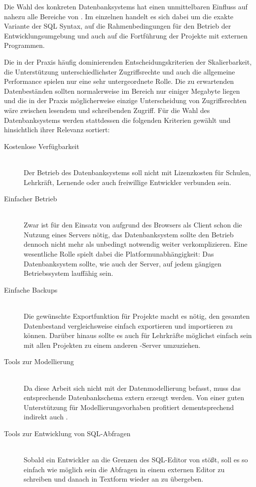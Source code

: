 Die Wahl des konkreten Datenbanksystems hat einen unmittelbaren Einfluss auf nahezu alle Bereiche von \idename. Im einzelnen handelt es sich dabei um die exakte Variante der SQL Syntax, auf die Rahmenbedingungen für den Betrieb der Entwicklungsumgebung und auch auf die Fortführung der Projekte mit externen Programmen.

Die in der Praxis häufig dominierenden Entscheidungskriterien der Skalierbarkeit, die Unterstützung unterschiedlichster Zugriffsrechte und auch die allgemeine Performance spielen nur eine sehr untergeordnete Rolle. Die zu erwartenden Datenbeständen sollten normalerweise im Bereich nur einiger Megabyte liegen und die in der Praxis möglicherweise einzige Unterscheidung von Zugriffsrechten wäre zwischen lesendem und schreibenden Zugriff. Für die Wahl des Datenbanksystems werden stattdessen die folgenden Kriterien gewählt und hinsichtlich ihrer Relevanz sortiert:

\begin{description}  
\item[Kostenlose Verfügbarkeit] \hfill \\
  Der Betrieb des Datenbanksystems soll nicht mit Lizenzkosten für Schulen, Lehrkräft, Lernende oder auch freiwillige Entwickler verbunden sein.
\item[Einfacher Betrieb] \hfill \\
  Zwar ist für den Einsatz von \idename aufgrund des Browsers als Client schon die Nutzung eines Servers nötig, das Datenbanksystem sollte den Betrieb dennoch nicht mehr als unbedingt notwendig weiter verkomplizieren. Eine wesentliche Rolle spielt dabei die Platformunabhängigkeit: Das Datenbanksystem sollte, wie auch der \idename Server, auf jedem gängigen Betriebssystem lauffähig sein.
\item[Einfache Backups] \hfill \\
  Die gewünschte Exportfunktion für Projekte macht es nötig, den gesamten Datenbestand vergleichsweise einfach exportieren und importieren zu können. Darüber hinaus sollte es auch für Lehrkräfte möglichst einfach sein mit allen Projekten zu einem anderen \idename-Server umzuziehen.
\item[Tools zur Modellierung] \hfill \\
  Da diese Arbeit sich nicht mit der Datenmodellierung befasst, muss das entsprechende Datenbankschema extern erzeugt werden. Von einer guten Unterstützung für Modellierungsvorhaben profitiert dementsprechend indirekt auch \idename.
\item[Tools zur Entwicklung von SQL-Abfragen] \hfill \\
  Sobald ein Entwickler an die Grenzen des SQL-Editor von \idename stößt, soll es so einfach wie möglich sein die Abfragen in einem externen Editor zu schreiben und danach in Textform wieder an \idename zu übergeben.
\end{description}


